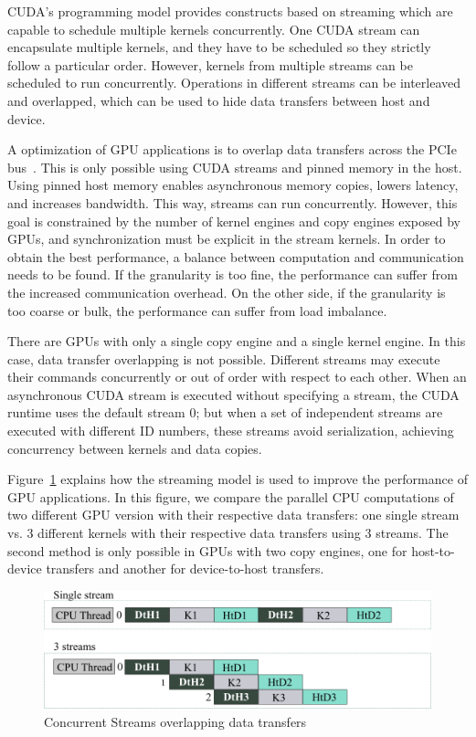 CUDA's programming model provides constructs based on streaming which are capable to schedule multiple kernels concurrently. One CUDA stream can encapsulate multiple kernels, and they have to be scheduled so they strictly follow a particular order. However, kernels from multiple streams can be scheduled to run concurrently. Operations in different streams can be interleaved and overlapped, which can be used to hide data transfers between host and device.

A optimization of GPU applications is to overlap data transfers across the PCIe bus~\citep{Martinasso16}. This is only possible using CUDA streams and pinned memory in the host. Using pinned host memory enables asynchronous memory copies, lowers latency, and increases bandwidth. This way, streams can run concurrently. However, this goal is constrained by the number of kernel engines and copy engines exposed by GPUs, and synchronization must be explicit in the stream kernels. In order to obtain the best performance, a balance between computation and communication needs to be found. If the granularity is too fine, the performance can suffer from the increased communication overhead. On the other side, if the granularity is too coarse or bulk, the performance can suffer from load imbalance. 

There are GPUs with only a single copy engine and a single kernel engine. In this case, data transfer overlapping is not possible. Different streams may execute their commands concurrently or out of order with respect to each other. When an asynchronous CUDA stream is executed without specifying a stream, the CUDA runtime uses the default stream 0; but when a set of independent streams are executed with different ID numbers, these streams avoid serialization, achieving concurrency between kernels and data copies.

Figure~\ref{fig:streams} explains how the streaming model is used to improve the performance of GPU applications. In this figure, we compare the parallel CPU computations of two different GPU version with their respective data transfers: one single stream vs. 3 different kernels with their respective data transfers using 3 streams. The second method is only possible in GPUs with two copy engines, one for host-to-device transfers and another for device-to-host transfers. 


\begin{figure}
	\centering
    \includegraphics[scale=.8]{images/stream.png}
    \caption{Concurrent Streams overlapping data transfers}
    \label{fig:streams}
\end{figure}